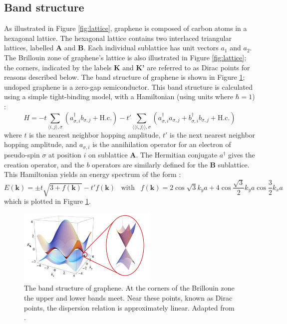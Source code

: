 \documentclass[edeposit,fullpage,draftthesis]{uiucthesis2009}
\begin{document}
	\subsection{Band structure}
    	
        As illustrated in Figure \ref{fig:lattice}, graphene is composed of carbon atoms in a hexagonal lattice. The hexagonal lattice contains two interlaced triangular lattices, labelled \textbf{A} and \textbf{B}. Each individual sublattice has unit vectors $a_1$ and $a_2$. The Brillouin zone of graphene's lattice is also illustrated in Figure \ref{fig:lattice}; the corners, indicated by the labels \textbf{K} and \textbf{K'} are referred to as Dirac points for reasons described below. 
        The band structure of graphene is shown in Figure \ref{fig:bandstructure}; undoped graphene is a zero-gap semiconductor. This band structure is calculated using a simple tight-binding model, with a Hamiltonian (using units where $\hbar=1$) \cite{CastroNeto2009}:
        \begin{equation}
        H = - t \sum\limits_{\langle i,j\rangle,\sigma} (a_{\sigma,i}^\dagger b_{\sigma,j} + \text{H.c.})
        - t' \sum\limits_{\langle\langle i,j\rangle\rangle,\sigma} (a_{\sigma,i}^\dagger a_{\sigma,j} + b_{\sigma,i}^\dagger b_{\sigma,j} + \text{H.c.})
        \end{equation}
        where $t$ is the nearest neighbor hopping amplitude, $t'$ is the next nearest neighbor hopping amplitude, and $a_{\sigma,i}$ is the annihilation operator for an electron of pseudo-spin $\sigma$ at position $i$ on sublattice \textbf{A}. The Hermitian conjugate $a^\dagger$ gives the creation operator, and the $b$ operators are similarly defined for the \textbf{B} sublattice. This Hamiltonian yields an energy spectrum of the form \cite{CastroNeto2009}:
        \begin{equation}
        E(\mathbf{k}) = \pm t \sqrt{3 + f(\mathbf{k})} - t' f(\mathbf{k}) \;\;\; \text{with} \;\;\; f(\mathbf{k}) = 2 \cos{\sqrt{3} k_y a } + 4 \cos{\frac{\sqrt{3}}{2} k_y a} \cos{\frac{3}{2} k_x a}
        \end{equation} 
        which is plotted in Figure \ref{fig:bandstructure}.
    
        \begin{figure}
        \centering
        \includegraphics[width=0.6\textwidth]{images/background/ElecPropertiesFig3.png}
        \caption[The band structure of graphene]{The band structure of graphene. At the corners of the Brillouin zone the upper and lower bands meet. Near these points, known as Dirac points, the dispersion relation is approximately linear. Adapted from \cite{CastroNeto2009}.}
        \label{fig:bandstructure}
        \end{figure}
    
\end{document}
